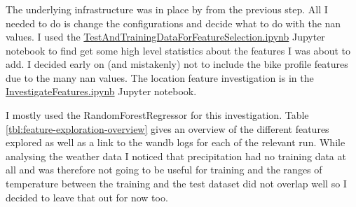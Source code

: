 \documentclass[a4paper]{article}
\begin{document}
    \subsubsection*{}
    The underlying infrastructure was in place by from the previous step. All I needed to do is change the configurations
    and decide what to do with the nan values. I used the
    \href{https://github.com/isabelladegen/mlp-2021/blob/c48d85dc364b5a2e7e59f16961b32f9e6c245735/notebooks/TestAndTrainingDataForFeatureSelection.ipynb}{TestAndTrainingDataForFeatureSelection.ipynb}
    Jupyter notebook to find get some high level statistics about the features I was about to add. I decided early
    on (and mistakenly) not to include the bike profile features due to the many nan values. The location feature investigation is
    in the \href{https://github.com/isabelladegen/mlp-2021/blob/c48d85dc364b5a2e7e59f16961b32f9e6c245735/notebooks/InvestigateFeatures.ipynb}{InvestigateFeatures.ipynb}
    Jupyter notebook.

    I mostly used the RandomForestRegressor for this investigation. Table \ref{tbl:feature-exploration-overview} gives an
    overview of the different
    features explored as well as a link to the wandb logs for each of the relevant run. While analysing the
    weather data I noticed that precipitation had no training data at all and was therefore not going to be useful for training and
    the ranges of temperature between the training and the test dataset did not overlap well so I decided to leave that out
    for now too.
\end{document}
